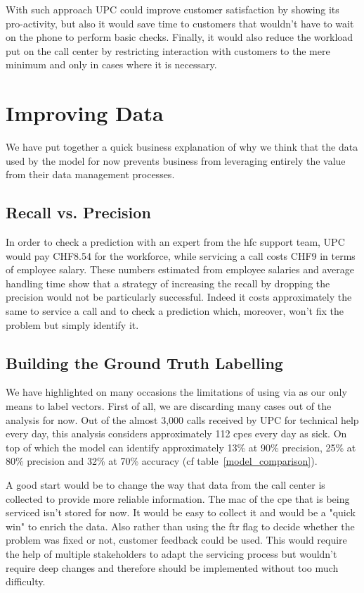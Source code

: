 With such approach UPC could improve customer satisfaction by showing its pro-activity, but also it would save time to customers that wouldn't have to wait on the phone to perform basic checks. Finally, it would also reduce the workload put on the call center by restricting interaction with customers to the mere minimum and only in cases where it is necessary. 

\section{Improving Data}
\label{sec:improving}
We have put together a quick business explanation of why we think that the data used by the model for now prevents business from leveraging entirely the value from their data management processes.

\subsection{Recall vs. Precision}
In order to check a prediction with an expert from the \acrshort{hfc} support team, UPC would pay CHF8.54 for the workforce, while servicing a call costs CHF9 in terms of employee salary. These numbers estimated from employee salaries and average handling time show that a strategy of increasing the recall by dropping the precision would not be particularly successful. Indeed it costs approximately the same to service a call and to check a prediction which, moreover, won't fix the problem but simply identify it. 

\subsection{Building the Ground Truth Labelling}
We have highlighted on many occasions the limitations of using \acrshort{via} as our only means to label vectors. First of all, we are discarding many cases out of the analysis for now. Out of the almost 3,000 calls received by UPC for technical help every day, this analysis considers approximately 112 \acrshort{cpe}s every day as sick. On top of which the model can identify approximately 13\% at 90\% precision, 25\% at 80\% precision and 32\% at 70\% accuracy (cf table~\ref{model_comparison}).

A good start would be to change the way that data from the call center is collected to provide more reliable information. The \acrshort{mac} of the \acrshort{cpe} that is being serviced isn't stored for now. It would be easy to collect it and would be a "quick win" to enrich the data. Also rather than using the \acrshort{ftr} flag to decide whether the problem was fixed or not, customer feedback could be used. This would require the help of multiple stakeholders to adapt the servicing process but wouldn't require deep changes and therefore should be implemented without too much difficulty.

